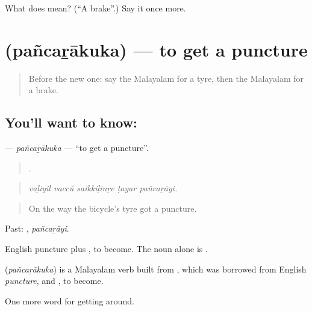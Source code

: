 \begin{tcolorbox}[breakable,colback=teal!4,colframe=teal!35!black,title={Before you move on}]
What does  mean? (\textquotedblleft{}A brake\textquotedblright{}.) Say it once more.
\end{tcolorbox}
\section[\texorpdfstring{\ml{പഞ്ചറാകുക} (pañcaṟākuka)}{പഞ്ചറാകുക (pañcaṟākuka)}]{ (pañcaṟākuka) — to get a puncture}

\label{lesson:ML-C470-pancarakuka}



\begin{quote}
Before the new one: say the Malayalam for a tyre, then the Malayalam for a brake.
\end{quote}

\subsection*{You'll want to know: }
\textbf{} — \emph{pañcaṟākuka} — \textquotedblleft{}to get a puncture\textquotedblright{}.

\begin{quote}
    .
\end{quote}

\begin{quote}
\emph{vaḻiyil vaccŭ saikkiḷinṟe ṭayar pañcaṟāyi.}
\end{quote}

\begin{quote}
On the way the bicycle's tyre got a puncture.
\end{quote}

Past: , \emph{pañcaṟāyi}.

English puncture plus , to become. The noun alone is .

\begin{cousinweb}
\textbf{} (\emph{pañcaṟākuka}) is a Malayalam verb built from , which was borrowed from English \emph{puncture}, and , to become.
\end{cousinweb}

\begin{grammarlens}[title={What you've built}]
One more word for getting around.
\end{grammarlens}

